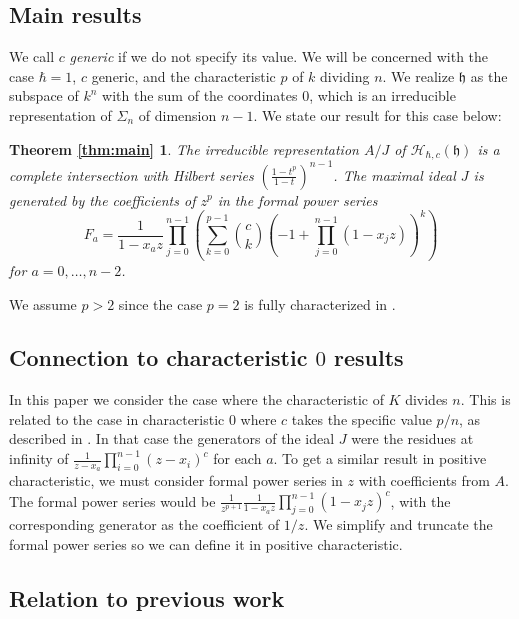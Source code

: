 \documentclass{article}
\numberwithin{equation}{section}
\newcommand{\h}{\mathfrak{h}}
\newcommand{\HH}{\mathcal{H}}
\begin{document}
\subsection{Main results}

 We call $c$ {\it generic} if we do not specify its value. We will be concerned with the case $\hbar=1$, $c$ generic, and the characteristic $p$ of $k$ dividing $n$. We realize $\h$ as the subspace of $k^n$ with the sum of the coordinates $0$, which is an irreducible representation of $\Sigma_n$ of dimension $n-1$. We state our result for this case below:
 
 \newtheorem*{thm:main}{Theorem \ref{thm:main}}
\begin{thm:main} The irreducible representation $A/J$  of $\HH_{\hbar,c}(\h)$ is a complete intersection with  Hilbert series $\left(\frac{1-t^p}{1-t}\right)^{n-1}$. The maximal ideal $J$ is generated by the coefficients of $z^p$ in the formal power series \\
$$F_a=\frac{1}{1-x_az} \prod_{j=0}^{n-1}\left( \sum_{k=0}^{p-1} \binom{c}{k}(-1+\prod_{j=0}^{n-1} (1-x_jz))^k\right)$$ for $a=0,\dots,n-2$. 
\end{thm:main}

We assume $p>2$ since the case $p=2$ is fully characterized in \cite{L}.

\subsection{Connection to characteristic $0$ results}

In this paper we consider the case where the characteristic of $K$ divides $n$. This is related to the case in characteristic $0$ where $c$ takes the specific value $p/n$, as described in \cite{CE}. In that case the generators of the ideal $J$ were the residues at infinity of $\frac{1}{z-x_a} \prod_{i=0}^{n-1} (z-x_i)^c$ for each $a$. %
To get a similar result in positive characteristic, we must consider formal power series in $z$ with coefficients from $A$. The formal power series would be $\frac{1}{z^{p+1}}\frac{1}{1-x_az}\prod_{j=0}^{n-1} (1-x_jz)^c$, with the corresponding generator as the coefficient of $1/z$. We simplify and truncate the formal power series so we can define it in positive characteristic.

\subsection{Relation to previous work}
\end{document}
